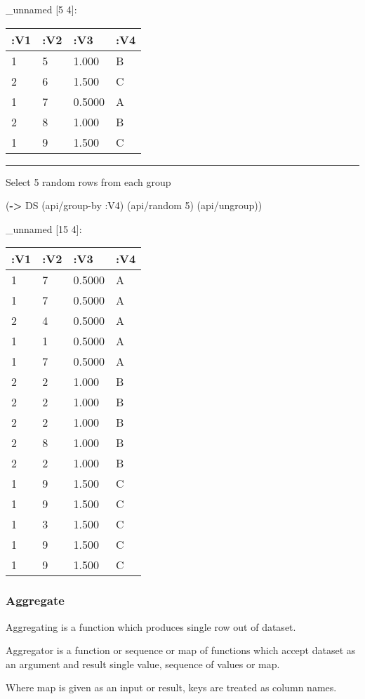 \documentclass[]{article}
\newenvironment{Shaded}{\begin{snugshade}}{\end{snugshade}}
\newcommand{\KeywordTok}[1]{\textcolor[rgb]{0.13,0.29,0.53}{\textbf{#1}}}
\newcommand{\DecValTok}[1]{\textcolor[rgb]{0.00,0.00,0.81}{#1}}
\newcommand{\AttributeTok}[1]{\textcolor[rgb]{0.77,0.63,0.00}{#1}}
\newcommand{\NormalTok}[1]{#1}
\begin{document}
\_unnamed {[}5 4{]}:

\begin{longtable}[]{@{}llll@{}}
\toprule
:V1 & :V2 & :V3 & :V4\tabularnewline
\midrule
\endhead
1 & 5 & 1.000 & B\tabularnewline
2 & 6 & 1.500 & C\tabularnewline
1 & 7 & 0.5000 & A\tabularnewline
2 & 8 & 1.000 & B\tabularnewline
1 & 9 & 1.500 & C\tabularnewline
\bottomrule
\end{longtable}

\begin{center}\rule{0.5\linewidth}{0.5pt}\end{center}

Select 5 random rows from each group

\begin{Shaded}
\begin{Highlighting}[]
\NormalTok{(}\KeywordTok{->}\NormalTok{ DS}
\NormalTok{    (api/group-by }\AttributeTok{:V4}\NormalTok{)}
\NormalTok{    (api/random }\DecValTok{5}\NormalTok{)}
\NormalTok{    (api/ungroup))}
\end{Highlighting}
\end{Shaded}

\_unnamed {[}15 4{]}:

\begin{longtable}[]{@{}llll@{}}
\toprule
:V1 & :V2 & :V3 & :V4\tabularnewline
\midrule
\endhead
1 & 7 & 0.5000 & A\tabularnewline
1 & 7 & 0.5000 & A\tabularnewline
2 & 4 & 0.5000 & A\tabularnewline
1 & 1 & 0.5000 & A\tabularnewline
1 & 7 & 0.5000 & A\tabularnewline
2 & 2 & 1.000 & B\tabularnewline
2 & 2 & 1.000 & B\tabularnewline
2 & 2 & 1.000 & B\tabularnewline
2 & 8 & 1.000 & B\tabularnewline
2 & 2 & 1.000 & B\tabularnewline
1 & 9 & 1.500 & C\tabularnewline
1 & 9 & 1.500 & C\tabularnewline
1 & 3 & 1.500 & C\tabularnewline
1 & 9 & 1.500 & C\tabularnewline
1 & 9 & 1.500 & C\tabularnewline
\bottomrule
\end{longtable}

\subsubsection{Aggregate}\label{aggregate}

Aggregating is a function which produces single row out of dataset.

Aggregator is a function or sequence or map of functions which accept
dataset as an argument and result single value, sequence of values or
map.

Where map is given as an input or result, keys are treated as column
names.
\end{document}
